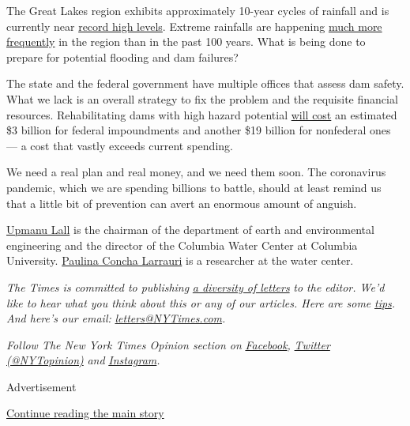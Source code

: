 The Great Lakes region exhibits approximately 10-year cycles of rainfall
and is currently near
\href{https://www.glerl.noaa.gov/data/wlevels/levels.html\#observations}{record
high levels}. Extreme rainfalls are happening
\href{https://michigan-weather-center.org/weather-extremes-pt-2}{much
more frequently} in the region than in the past 100 years. What is being
done to prepare for potential flooding and dam failures?

The state and the federal government have multiple offices that assess
dam safety. What we lack is an overall strategy to fix the problem and
the requisite financial resources. Rehabilitating dams with high hazard
potential \href{https://fas.org/sgp/crs/homesec/IF10606.pdf}{will cost}
an estimated \$3 billion for federal impoundments and another \$19
billion for nonfederal ones --- a cost that vastly exceeds current
spending.

We need a real plan and real money, and we need them soon. The
coronavirus pandemic, which we are spending billions to battle, should
at least remind us that a little bit of prevention can avert an enormous
amount of anguish.

\href{http://www.columbia.edu/~ula2/}{Upmanu Lall} is the chairman of
the department of earth and environmental engineering and the director
of the Columbia Water Center at Columbia University.
\href{https://www.earth.columbia.edu/users/profile/paulina-concha-larrauri}{Paulina
Concha Larrauri} is a researcher at the water center.

\emph{The Times is committed to publishing}
\href{https://www.nytimes3xbfgragh.onion/2019/01/31/opinion/letters/letters-to-editor-new-york-times-women.html}{\emph{a
diversity of letters}} \emph{to the editor. We'd like to hear what you
think about this or any of our articles. Here are some}
\href{https://help.nytimes3xbfgragh.onion/hc/en-us/articles/115014925288-How-to-submit-a-letter-to-the-editor}{\emph{tips}}\emph{.
And here's our email:}
\href{mailto:letters@NYTimes.com}{\emph{letters@NYTimes.com}}\emph{.}

\emph{Follow The New York Times Opinion section on}
\href{https://www.facebookcorewwwi.onion/nytopinion}{\emph{Facebook}}\emph{,}
\href{http://twitter.com/NYTOpinion}{\emph{Twitter (@NYTopinion)}}
\emph{and}
\href{https://www.instagram.com/nytopinion/}{\emph{Instagram}}\emph{.}

Advertisement

\protect\hyperlink{after-bottom}{Continue reading the main story}

